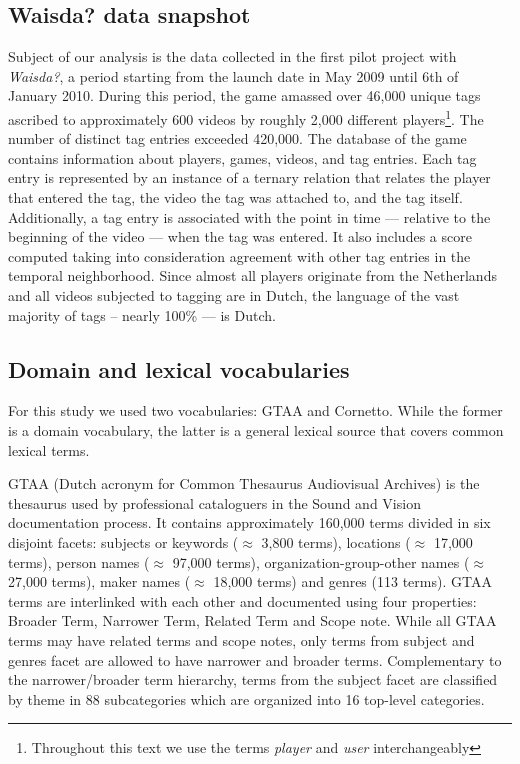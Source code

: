 \subsection{Waisda? data snapshot}\label{waisda_ds}

Subject of our analysis is the data collected in the first pilot project with
\emph{Waisda?}, a period starting from the launch date in May 2009 until 6th
of January 2010. During this period, the game amassed over 46,000 unique tags
ascribed to approximately 600 videos by roughly 2,000 different
players\footnote{Throughout this text we use the terms \textit{player} and
\textit{user} interchangeably }. The number of distinct tag entries exceeded
420,000. The database of the game contains information about players, games,
videos, and tag entries. Each tag entry is represented by an instance of a
ternary relation that relates the player that entered the tag, the video the
tag was attached to, and the tag itself. Additionally, a tag entry is
associated with the point in time --- relative to the beginning of the video
--- when the tag was entered. It also includes a score computed taking into
consideration agreement with other tag entries in the temporal neighborhood.
Since almost all players originate from the Netherlands and all videos
subjected to tagging are in Dutch, the language of the vast majority of tags
-- nearly 100\% --- is Dutch.

\subsection{Domain and lexical vocabularies}\label{vocs}
For this study we used two vocabularies: GTAA and Cornetto. While the former is a domain vocabulary, the latter is a general lexical source that covers common lexical terms.

GTAA (Dutch acronym for Common Thesaurus Audiovisual Archives) is the thesaurus used by professional cataloguers in the Sound and Vision documentation process. It contains approximately 160,000 terms divided in six disjoint facets: subjects or keywords ($\approx$ 3,800 terms), locations ($\approx$ 17,000 terms), person names ($\approx$ 97,000 terms), organization-group-other names ($\approx$ 27,000 terms), maker names ($\approx$ 18,000 terms) and genres (113 terms). GTAA terms are interlinked with each other and documented using four properties: Broader Term, Narrower Term, Related Term and Scope note. While all GTAA terms may have related terms and scope notes, only terms from subject and genres facet are allowed to have narrower and broader terms. Complementary to the narrower/broader term hierarchy, terms from the subject facet are classified by theme in 88 subcategories which are organized into 16 top-level categories.

